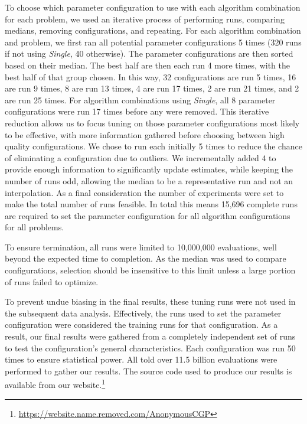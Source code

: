 \documentclass[journal]{IEEEtran}
\begin{document}
To choose which parameter configuration to use with each algorithm combination
for each problem, we used an iterative process of performing runs, comparing medians, removing configurations,
and repeating.  For each algorithm combination and problem, we first ran all
potential parameter configurations 5 times (320 runs if not using \emph{Single}, 40 otherwise).
The parameter configurations are then sorted based on their median.  The best half are then
each run 4 more times, with the best half of that group chosen.  In this way, 32 configurations
are run 5 times, 16 are run 9 times, 8 are run 13 times, 4 are run 17 times, 2 are run 21 times,
and 2 are run 25 times.  For algorithm combinations using \emph{Single}, all 8 parameter configurations were run 17 times
before any were removed.  This iterative reduction allows us to focus tuning on
those parameter configurations most likely to be effective, with more information
gathered before choosing between high quality configurations.
We chose to run each initially 5 times to reduce the chance of
eliminating a configuration due to outliers.  We incrementally added 4
to provide enough information to significantly update estimates,
while keeping the number of runs odd, allowing the median to be a
representative run and not an interpolation.  As a final consideration
the number of experiments were set to make the total number of runs feasible.
In total this means
15,696 complete runs are required to set the parameter configuration for all
algorithm configurations for all problems.

To ensure termination, all runs were limited to 10,000,000 evaluations, well beyond
the expected time to completion.  As the median was used to compare configurations,
selection should be insensitive to this limit unless a large
portion of runs failed to optimize.

To prevent undue biasing in the final results, these tuning runs were
not used in the subsequent data analysis.  Effectively, the runs used to set
the parameter configuration were considered
the training runs for that configuration.  As a result, our final results were gathered
from a completely independent set of runs to test the configuration's general characteristics.
Each configuration was run 50 times to ensure statistical power.  All told over
11.5 billion evaluations were performed to gather our results.  The source code
used to produce our results is available from our website.\footnote{\url{https://website.name.removed.com/AnonymousCGP}}
\end{document}
